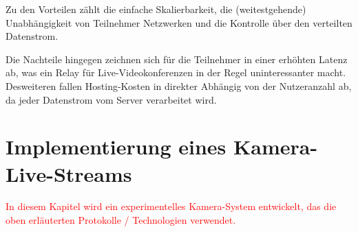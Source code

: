 \documentclass{article}
\begin{document}
\begin{onecolumn}
Zu den Vorteilen zählt die einfache Skalierbarkeit, die (weitestgehende)
Unabhängigkeit von Teilnehmer Netzwerken und die Kontrolle über den verteilten
Datenstrom.

Die Nachteile hingegen zeichnen sich für die Teilnehmer in einer erhöhten
Latenz ab, was ein Relay für Live-Videokonferenzen in der Regel uninteressanter
macht. Desweiteren fallen Hosting-Kosten in direkter Abhängig von der
Nutzeranzahl ab, da jeder Datenstrom vom Server verarbeitet wird.




\section{Implementierung eines Kamera-Live-Streams}

\textcolor{red}{In diesem Kapitel wird ein experimentelles Kamera-System
entwickelt, das die oben erläuterten Protokolle / Technologien verwendet.}


\end{onecolumn}
\end{document}
